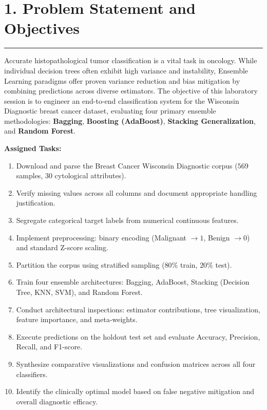 \documentclass[11pt,a4paper]{article}
\begin{document}
\newpage
{}

\section*{1. Problem Statement and Objectives}
\noindent\rule{\textwidth}{0.5pt}\vspace{0.05cm}

Accurate histopathological tumor classification is a vital task in oncology. While individual decision trees often exhibit high variance and instability, Ensemble Learning paradigms offer proven variance reduction and bias mitigation by combining predictions across diverse estimators. The objective of this laboratory session is to engineer an end-to-end classification system for the Wisconsin Diagnostic breast cancer dataset, evaluating four primary ensemble methodologies: \textbf{Bagging}, \textbf{Boosting (AdaBoost)}, \textbf{Stacking Generalization}, and \textbf{Random Forest}.

\vspace{0.05cm}
\noindent\textbf{Assigned Tasks:}
\begin{enumerate}[noitemsep,topsep=1pt,leftmargin=*]
    \item Download and parse the Breast Cancer Wisconsin Diagnostic corpus ($569$ samples, $30$ cytological attributes).
    \item Verify missing values across all columns and document appropriate handling justification.
    \item Segregate categorical target labels from numerical continuous features.
    \item Implement preprocessing: binary encoding (Malignant $\rightarrow 1$, Benign $\rightarrow 0$) and standard Z-score scaling.
    \item Partition the corpus using stratified sampling ($80\%$ train, $20\%$ test).
    \item Train four ensemble architectures: Bagging, AdaBoost, Stacking (Decision Tree, KNN, SVM), and Random Forest.
    \item Conduct architectural inspections: estimator contributions, tree visualization, feature importance, and meta-weights.
    \item Execute predictions on the holdout test set and evaluate Accuracy, Precision, Recall, and F1-score.
    \item Synthesize comparative visualizations and confusion matrices across all four classifiers.
    \item Identify the clinically optimal model based on false negative mitigation and overall diagnostic efficacy.
\end{enumerate}
\end{document}
